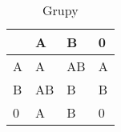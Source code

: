 \begin{table}[htbp]
    \centering
\begin{tabular}{|l|l|l|l|}
\hline
  & A  & B  & 0 \\ \hline
A & A  & AB & A \\ \hline
B & AB & B  & B \\ \hline
0 & A  & B  & 0 \\ \hline
\end{tabular}
\caption{Grupy}
\label{tab:tabela4}
\end{table}